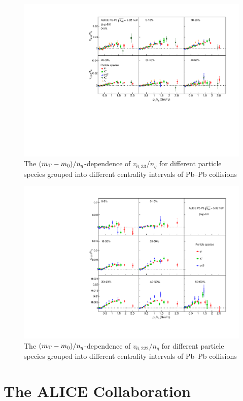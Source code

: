 \documentclass[ALICE,manyauthors]{cernphprep}
\begin{document}
\begin{figure}[htb]
\begin{center}
\includegraphics[scale=0.82]{figures/scaling/All_v633_gap00_KET_3by2.pdf}

\end{center}
\caption{The $(m_{\rm{T}} - m_{0})/n_{q}$-dependence of $v_{6,33}/n_{q}$ for different particle species grouped into different centrality intervals of Pb--Pb collisions \sNN}
\label{v633_KET}
\end{figure}

\begin{figure}[htb]
\begin{center}
\includegraphics[scale=0.82]{figures/scaling/All_v6222_gap00_KET_3by3.pdf}

\end{center}
\caption{The $(m_{\rm{T}} - m_{0})/n_{q}$-dependence of $v_{6,222}/n_{q}$ for different particle species grouped into different centrality intervals of Pb--Pb collisions \sNN}
\label{v6222_KET}
\end{figure}

%
%

\section{The ALICE Collaboration}
\label{app:collab}
%  
\end{document}
